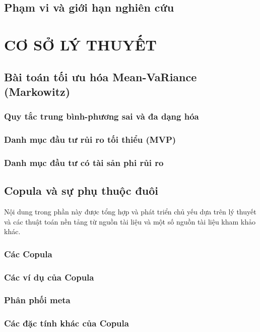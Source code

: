 \documentclass[a4paper,12pt]{article}
\begin{document}
\subsection{Phạm vi và giới hạn nghiên cứu}

\section{CƠ SỞ LÝ THUYẾT}
\subsection{Bài toán tối ưu hóa Mean-VaRiance (Markowitz)}
\subsubsection{Quy tắc trung bình-phương sai và đa dạng hóa}

\subsubsection{Danh mục đầu tư rủi ro tối thiểu (MVP)}

\subsubsection{Danh mục đầu tư có tài sản phi rủi ro}

\subsection{Copula và sự phụ thuộc đuôi}
Nội dung trong phần này được tổng hợp và phát triển chủ yếu dựa trên lý thuyết và các thuật toán nền tảng từ nguồn tài liệu \cite{mcneil2015quantitative} và một số nguồn tài liệu kham khảo khác.\\
\subsubsection{Các Copula}

\subsubsection{Các ví dụ của Copula}

\subsubsection{Phân phối meta}

\subsubsection{Các đặc tính khác của Copula}

\end{document}
